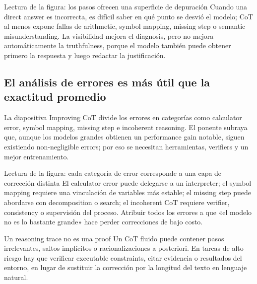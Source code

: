 
\begin{knowledgebox}{Lectura de la figura: los pasos ofrecen una superficie de depuración}
Cuando una direct answer es incorrecta, es difícil saber en qué punto se desvió el modelo; CoT al menos expone fallas de arithmetic, symbol mapping, missing step o semantic misunderstanding. La visibilidad mejora el diagnosis, pero no mejora automáticamente la truthfulness, porque el modelo también puede obtener primero la respuesta y luego redactar la justificación.
\end{knowledgebox}

\subsection{El análisis de errores es más útil que la exactitud promedio}

La diapositiva Improving CoT divide los errores en categorías como calculator error, symbol mapping, missing step e incoherent reasoning. El ponente subraya que, aunque los modelos grandes obtienen un performance gain notable, siguen existiendo non-negligible errors; por eso se necesitan herramientas, verifiers y un mejor entrenamiento.


\begin{knowledgebox}{Lectura de la figura: cada categoría de error corresponde a una capa de corrección distinta}
El calculator error puede delegarse a un interpreter; el symbol mapping requiere una vinculación de variables más estable; el missing step puede abordarse con decomposition o search; el incoherent CoT requiere verifier, consistency o supervisión del proceso. Atribuir todos los errores a que «el modelo no es lo bastante grande» hace perder correcciones de bajo costo.
\end{knowledgebox}

\begin{warningbox}{Un reasoning trace no es una proof}
Un CoT fluido puede contener pasos irrelevantes, saltos implícitos o racionalizaciones a posteriori. En tareas de alto riesgo hay que verificar executable constraints, citar evidencia o resultados del entorno, en lugar de sustituir la corrección por la longitud del texto en lenguaje natural.
\end{warningbox}

